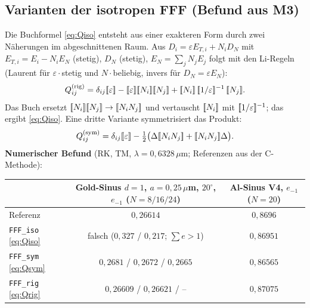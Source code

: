 \subsection{Varianten der isotropen FFF (Befund aus M3)}\label{sec:fffvariants}
Die Buchformel \eqref{eq:Qiso} entsteht aus einer exakteren Form durch zwei Näherungen im
abgeschnittenen Raum. Aus $D_i=\varepsilon E_{T,i}+N_iD_N$ mit $E_{T,i}=E_i-N_iE_N$ (stetig), $D_N$ (stetig),
$E_N=\sum_jN_jE_j$ folgt mit den Li-Regeln (Laurent für $\varepsilon\cdot$stetig und $N\cdot$beliebig,
invers für $D_N=\varepsilon E_N$):
\begin{equation}
  Q^{(\mathrm{rig})}_{ij}=\delta_{ij}\tp{\varepsilon}-\tp{\varepsilon}\tp{N_i}\tp{N_j}+\tp{N_i}\,\Li\,\tp{N_j}.
  \label{eq:Qrig}
\end{equation}
Das Buch ersetzt $[\![N_i]\!][\![N_j]\!]\to[\![N_iN_j]\!]$ und vertauscht $[\![N_i]\!]$ mit $[\![1/\varepsilon]\!]^{-1}$; das ergibt
\eqref{eq:Qiso}. Eine dritte Variante symmetrisiert das Produkt:
\begin{equation}
  Q^{(\mathrm{sym})}_{ij}=\delta_{ij}[\![\varepsilon]\!]-\tfrac12\big(\Delta[\![N_iN_j]\!]+[\![N_iN_j]\!]\Delta\big).
  \label{eq:Qsym}
\end{equation}
\textbf{Numerischer Befund} (RK, TM, $\lambda=0{,}6328\,\mu$m; Referenzen aus der C-Methode):
\begin{center}
\small
\begin{tabular}{lcc}
\toprule
& Gold-Sinus $d=1$, $a=0{,}25\,\mu$m, $20^\circ$, $e_{-1}$ ($N=8/16/24$) & Al-Sinus V4, $e_{-1}$ ($N=20$) \\
\midrule
Referenz & $0{,}26614$ & $0{,}8696$ \\
\verb|FFF_iso| \eqref{eq:Qiso} & falsch ($0{,}327$ / $0{,}217$; $\sum e>1$) & $0{,}86951$ \\
\verb|FFF_sym| \eqref{eq:Qsym} & $0{,}2681$ / $0{,}2672$ / $0{,}2665$ & $0{,}86565$ \\
\verb|FFF_rig| \eqref{eq:Qrig} & $0{,}26609$ / $0{,}26621$ / -- & $0{,}87075$ \\
\bottomrule
\end{tabular}
\end{center}
